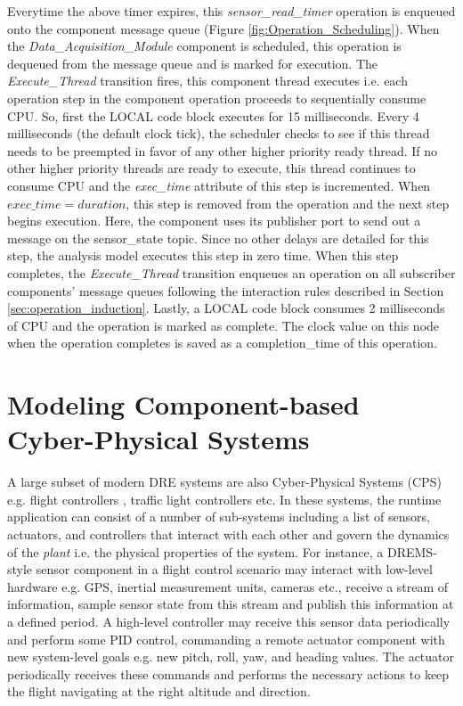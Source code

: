 Everytime the above timer expires, this \emph{sensor\_read\_timer} operation is enqueued onto the component message queue (Figure \ref{fig:Operation_Scheduling}). When the \emph{Data\_Acquisition\_Module} component is scheduled, this operation is dequeued from the message queue and is marked for execution. The \emph{Execute\_Thread} transition fires, this component thread executes i.e. each operation step in the component operation proceeds to sequentially consume CPU. So, first the LOCAL code block executes for 15 milliseconds. Every 4 milliseconds (the default clock tick), the scheduler checks to see if this thread needs to be preempted in favor of any other higher priority ready thread. If no other higher priority threads are ready to execute, this thread continues to consume CPU and the \emph{exec\_time} attribute of this step is incremented. When $exec\_time = duration$, this step is removed from the operation and the next step begins execution. Here, the component uses its publisher port to send out a message on the sensor\_state topic. Since no other delays are detailed for this step, the analysis model executes this step in zero time. When this step completes, the \emph{Execute\_Thread} transition enqueues an operation on all subscriber components' message queues following the interaction rules described in Section \ref{sec:operation_induction}. Lastly, a LOCAL code block consumes 2 milliseconds of CPU and the operation is marked as complete. The clock value on this node when the operation completes is saved as a completion\_time of this operation.  


\section{Modeling Component-based Cyber-Physical Systems}

A large subset of modern DRE systems are also Cyber-Physical Systems (CPS) e.g. flight controllers \cite{sharp1998reducing}, traffic light controllers \cite{huber1998traffic} etc. In these systems, the runtime application can consist of a number of sub-systems including a list of sensors, actuators, and controllers that interact with each other and govern the dynamics of the \emph{plant} i.e. the physical properties of the system. For instance, a DREMS-style sensor component in a flight control scenario may interact with low-level hardware e.g. GPS, inertial measurement units, cameras etc., receive a stream of information, sample sensor state from this stream and publish this information at a defined period. A high-level controller may receive this sensor data periodically and perform some PID control, commanding a remote actuator component with new system-level goals e.g. new pitch, roll, yaw, and heading values. The actuator periodically receives these commands and performs the necessary actions to keep the flight navigating at the right altitude and direction. 

